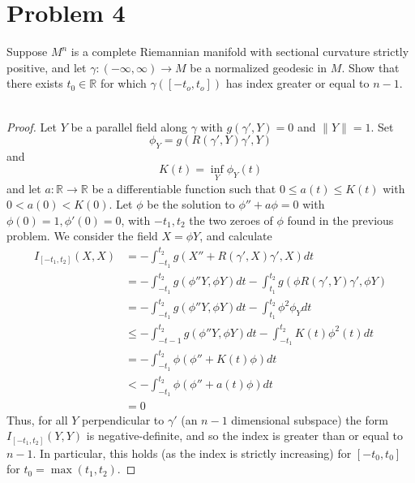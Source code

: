 \documentclass[fontsize=11pt]{scrartcl} %
\numberwithin{equation}{section} %
\numberwithin{figure}{section} %
\numberwithin{table}{section} %
\newcommand{\R}{\mathbb{R}}
\begin{document}
\section*{Problem 4}
Suppose $M^n$ is a complete Riemannian manifold with sectional curvature
strictly positive, and let $\gamma:(-\infty,\infty)\to M$ be a normalized
geodesic in $M$. Show that there exists $t_0\in \R$ for which
$\gamma([-t_o,t_o])$ has index greater or equal to $n-1$.
\\
\\
\begin{proof}
    Let $Y$ be a parallel field along $\gamma$ with $g(\gamma',Y)=0$ and
    $\|Y\|=1$. Set
    \[
        \phi_Y = g(R(\gamma',Y)\gamma',Y)
    \]
    and
    \[
        K(t) = \inf_Y\phi_Y(t)
    \]
    and let $a:\R\to\R$ be a differentiable function such that $0\leq a(t)\leq
    K(t)$ with $0<a(0)<K(0)$. Let $\phi$ be the solution to $\phi'' + a\phi = 0$
    with $\phi(0)=1,\phi'(0)=0$, with $-t_1,t_2$ the two zeroes of $\phi$ found
    in the previous problem. We consider the field $X = \phi Y$, and calculate
    \[
        \begin{aligned}
            I_{[-t_1,t_2]}(X,X) &= -\int_{-t_1}^{t_2}g(X'' +
            R(\gamma',X)\gamma',X)dt\\
            &= -\int_{-t_1}^{t_2}g(\phi''Y,\phi Y)dt - \int_{t_1}^{t_2}g(\phi
            R(\gamma',Y)\gamma',\phi Y)\\
            &= -\int_{-t_1}^{t_2}g(\phi''Y,\phi Y)dt -
            \int_{t_1}^{t_2}\phi^2\phi_Ydt\\
            &\leq -\int_{-t-1}^{t_2}g(\phi''Y,\phi Y)dt -
            \int_{-t_1}^{t_2}K(t)\phi^2(t)dt\\
            &=-\int_{-t_1}^{t_2}\phi(\phi'' + K(t)\phi)dt\\
            &<-\int_{-t_1}^{t_2}\phi(\phi'' + a(t)\phi)dt\\
            &=0
        \end{aligned}
    \]
    Thus, for all $Y$ perpendicular to $\gamma'$ (an $n-1$ dimensional subspace)
    the form $I_{[-t_1,t_2]}(Y,Y)$ is negative-definite, and so the index is
    greater than or equal to $n-1$. In particular, this holds (as the index is
    strictly increasing) for $[-t_0,t_0]$ for $t_0 = \max(t_1,t_2)$.
\end{proof}

\newpage
\end{document}
